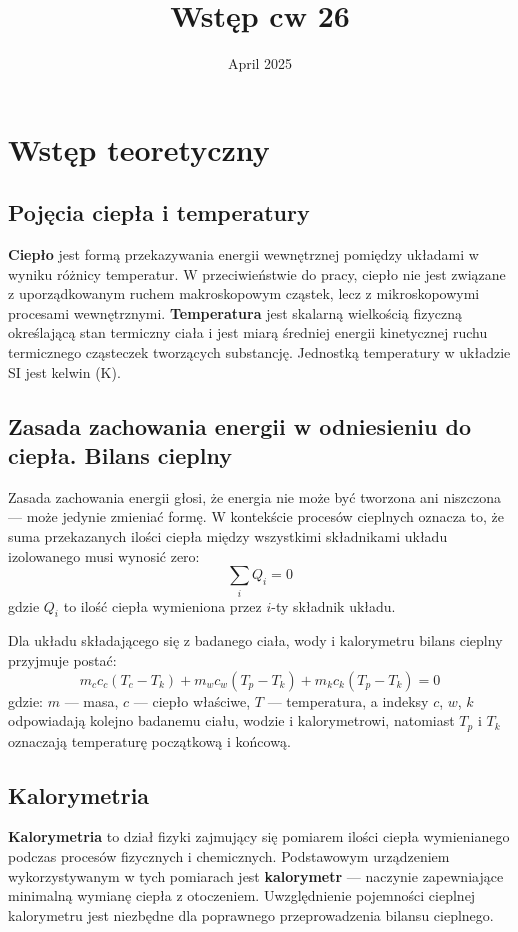 \documentclass{article}
\title{Wstęp cw 26}
\author{}
\date{April 2025}
\begin{document}
\maketitle

\section*{Wstęp teoretyczny}

\subsection*{Pojęcia ciepła i temperatury}

\textbf{Ciepło} jest formą przekazywania energii wewnętrznej pomiędzy układami w wyniku różnicy temperatur. W przeciwieństwie do pracy, ciepło nie jest związane z uporządkowanym ruchem makroskopowym cząstek, lecz z mikroskopowymi procesami wewnętrznymi.
\textbf{Temperatura} jest skalarną wielkością fizyczną określającą stan termiczny ciała i jest miarą średniej energii kinetycznej ruchu termicznego cząsteczek tworzących substancję. Jednostką temperatury w układzie SI jest kelwin (K).

\subsection*{Zasada zachowania energii w odniesieniu do ciepła. Bilans cieplny}

Zasada zachowania energii głosi, że energia nie może być tworzona ani niszczona — może jedynie zmieniać formę.
W kontekście procesów cieplnych oznacza to, że suma przekazanych ilości ciepła między wszystkimi składnikami układu izolowanego musi wynosić zero:
\[
    \sum_i Q_i = 0
\]
gdzie \( Q_i \) to ilość ciepła wymieniona przez \( i \)-ty składnik układu.

Dla układu składającego się z badanego ciała, wody i kalorymetru bilans cieplny przyjmuje postać:
\[
    m_c c_c (T_c - T_k) + m_w c_w (T_p - T_k) + m_k c_k (T_p - T_k) = 0
\]
gdzie:
\( m \) — masa,
\( c \) — ciepło właściwe,
\( T \) — temperatura,
a indeksy \( c \), \( w \), \( k \) odpowiadają kolejno badanemu ciału, wodzie i kalorymetrowi, natomiast \( T_p \) i \( T_k \) oznaczają temperaturę początkową i końcową.

\subsection*{Kalorymetria}

\textbf{Kalorymetria} to dział fizyki zajmujący się pomiarem ilości ciepła wymienianego podczas procesów fizycznych i chemicznych. Podstawowym urządzeniem wykorzystywanym w tych pomiarach jest \textbf{kalorymetr} — naczynie zapewniające minimalną wymianę ciepła z otoczeniem. Uwzględnienie pojemności cieplnej kalorymetru jest niezbędne dla poprawnego przeprowadzenia bilansu cieplnego.
\end{document}
